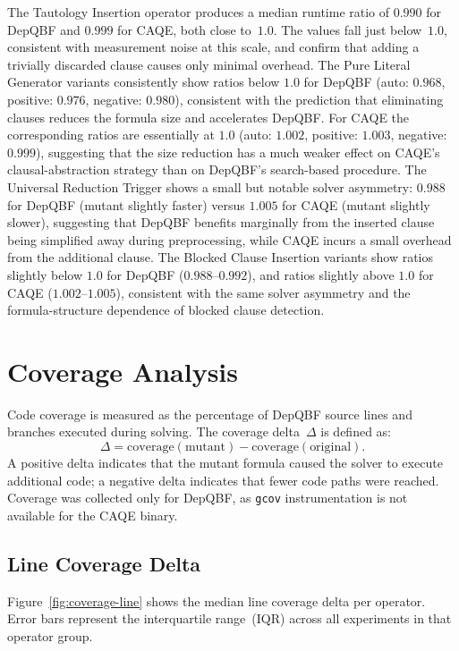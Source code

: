 The Tautology Insertion operator produces a median runtime ratio of 
$0.990$ for DepQBF and $0.999$ for CAQE, both close to~$1.0$. The values 
fall just below~$1.0$, consistent with measurement noise at this scale, 
and confirm that adding a trivially discarded clause causes only minimal overhead.
The Pure Literal Generator variants consistently show ratios below $1.0$ for DepQBF 
(auto: $0.968$, positive: $0.976$, negative: $0.980$), consistent with the prediction 
that eliminating clauses reduces the formula size and accelerates DepQBF. 
For CAQE the corresponding ratios are essentially at $1.0$ (auto: $1.002$, 
positive: $1.003$, negative: $0.999$), suggesting that the size reduction has 
a much weaker effect on CAQE's clausal-abstraction strategy than on DepQBF's 
search-based procedure. The Universal Reduction Trigger shows a small but 
notable solver asymmetry: $0.988$ for DepQBF (mutant slightly faster) 
versus $1.005$ for CAQE (mutant slightly slower), suggesting that 
DepQBF benefits marginally from the inserted clause being simplified 
away during preprocessing, while CAQE incurs a small overhead from 
the additional clause. The Blocked Clause Insertion variants show 
ratios slightly below $1.0$ for DepQBF ($0.988$--$0.992$), and ratios 
slightly above $1.0$ for CAQE ($1.002$--$1.005$), consistent with 
the same solver asymmetry and the formula-structure dependence of 
blocked clause detection.

\section{Coverage Analysis}\label{sec:coverage}

Code coverage is measured as the percentage of DepQBF source lines and branches
executed during solving. The coverage delta~$\Delta$ is defined as:
\[
  \Delta = \text{coverage}(\text{mutant}) - \text{coverage}(\text{original}).
\]
A positive delta indicates that the mutant formula caused the solver to execute
additional code; a negative delta indicates that fewer code paths were reached.
Coverage was collected only for DepQBF, as \texttt{gcov} instrumentation is not
available for the CAQE binary.

\subsection{Line Coverage Delta}

Figure~\ref{fig:coverage-line} shows the median line coverage delta per operator.
Error bars represent the interquartile range~(IQR) across all experiments in that
operator group.

